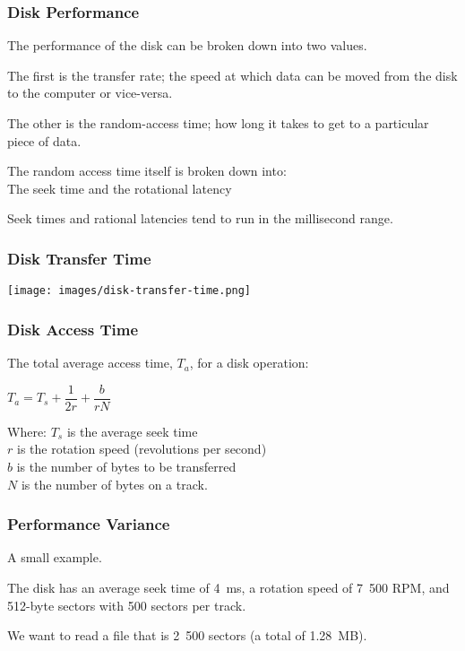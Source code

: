 \begin{frame}
\frametitle{Disk Performance}

The performance of the disk can be broken down into two values. 

The first is the \alert{transfer rate}; the speed at which data can be moved from the disk to the computer or vice-versa. 

The other is the \alert{random-access time}; how long it takes to get to a particular piece of data. 

The random access time itself is broken down into:\\
\quad The \alert{seek time} and the \alert{rotational latency}

Seek times and rational latencies tend to run in the millisecond range.


\end{frame}

\begin{frame}
\frametitle{Disk Transfer Time}

\begin{center}
	\texttt{[image: images/disk-transfer-time.png]}
\end{center}


\end{frame}

\begin{frame}
\frametitle{Disk Access Time}

The total average access time, $T_{a}$, for a disk operation:

\begin{center}
$T_{a} = T_{s} + \dfrac{1}{2r} + \dfrac{b}{rN}$
\end{center}

Where: $T_{s}$ is the average seek time\\
\quad $r$ is the rotation speed (revolutions per second)\\
\quad $b$ is the number of bytes to be transferred\\ 
\quad $N$ is the number of bytes on a track.


\end{frame}

\begin{frame}
\frametitle{Performance Variance}

A small example.

The disk has an average seek time of 4~ms, a rotation speed of 7~500 RPM, and 512-byte sectors with 500 sectors per track. 

We want to read a file that is 2~500 sectors (a total of 1.28~MB). 

\end{frame}

